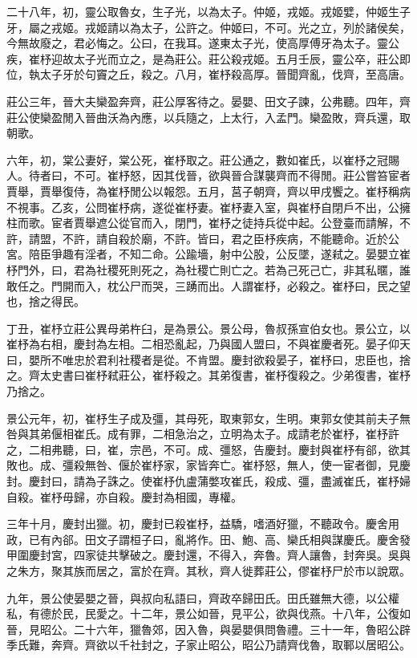 二十八年，初，靈公取魯女，生子光，以為太子。仲姬，戎姬。戎姬嬖，仲姬生子牙，屬之戎姬。戎姬請以為太子，公許之。仲姬曰，不可。光之立，列於諸侯矣，今無故廢之，君必悔之。公曰，在我耳。遂東太子光，使高厚傅牙為太子。靈公疾，崔杼迎故太子光而立之，是為莊公。莊公殺戎姬。五月壬辰，靈公卒，莊公即位，執太子牙於句竇之丘，殺之。八月，崔杼殺高厚。晉聞齊亂，伐齊，至高唐。

莊公三年，晉大夫欒盈奔齊，莊公厚客待之。晏嬰、田文子諫，公弗聽。四年，齊莊公使欒盈閒入晉曲沃為內應，以兵隨之，上太行，入孟門。欒盈敗，齊兵還，取朝歌。

六年，初，棠公妻好，棠公死，崔杼取之。莊公通之，數如崔氏，以崔杼之冠賜人。待者曰，不可。崔杼怒，因其伐晉，欲與晉合謀襲齊而不得閒。莊公嘗笞宦者賈舉，賈舉復侍，為崔杼閒公以報怨。五月，莒子朝齊，齊以甲戌饗之。崔杼稱病不視事。乙亥，公問崔杼病，遂從崔杼妻。崔杼妻入室，與崔杼自閉戶不出，公擁柱而歌。宦者賈舉遮公從官而入，閉門，崔杼之徒持兵從中起。公登臺而請解，不許，請盟，不許，請自殺於廟，不許。皆曰，君之臣杼疾病，不能聽命。近於公宮。陪臣爭趣有淫者，不知二命。公踰墻，射中公股，公反墜，遂弒之。晏嬰立崔杼門外，曰，君為社稷死則死之，為社稷亡則亡之。若為己死己亡，非其私暱，誰敢任之。門開而入，枕公尸而哭，三踴而出。人謂崔杼，必殺之。崔杼曰，民之望也，捨之得民。

丁丑，崔杼立莊公異母弟杵臼，是為景公。景公母，魯叔孫宣伯女也。景公立，以崔杼為右相，慶封為左相。二相恐亂起，乃與國人盟曰，不與崔慶者死。晏子仰天曰，嬰所不唯忠於君利社稷者是從。不肯盟。慶封欲殺晏子，崔杼曰，忠臣也，捨之。齊太史書曰崔杼弒莊公，崔杼殺之。其弟復書，崔杼復殺之。少弟復書，崔杼乃捨之。

景公元年，初，崔杼生子成及彊，其母死，取東郭女，生明。東郭女使其前夫子無咎與其弟偃相崔氏。成有罪，二相急治之，立明為太子。成請老於崔杼，崔杼許之，二相弗聽，曰，崔，宗邑，不可。成、彊怒，告慶封。慶封與崔杼有郤，欲其敗也。成、彊殺無咎、偃於崔杼家，家皆奔亡。崔杼怒，無人，使一宦者御，見慶封。慶封曰，請為子誅之。使崔杼仇盧蒲嫳攻崔氏，殺成、彊，盡滅崔氏，崔杼婦自殺。崔杼毋歸，亦自殺。慶封為相國，專權。

三年十月，慶封出獵。初，慶封已殺崔杼，益驕，嗜酒好獵，不聽政令。慶舍用政，已有內郤。田文子謂桓子曰，亂將作。田、鮑、高、欒氏相與謀慶氏。慶舍發甲圍慶封宮，四家徒共擊破之。慶封還，不得入，奔魯。齊人讓魯，封奔吳。吳與之朱方，聚其族而居之，富於在齊。其秋，齊人徙葬莊公，僇崔杼尸於市以說眾。

九年，景公使晏嬰之晉，與叔向私語曰，齊政卒歸田氏。田氏雖無大德，以公權私，有德於民，民愛之。十二年，景公如晉，見平公，欲與伐燕。十八年，公復如晉，見昭公。二十六年，獵魯郊，因入魯，與晏嬰俱問魯禮。三十一年，魯昭公辟季氏難，奔齊。齊欲以千社封之，子家止昭公，昭公乃請齊伐魯，取鄆以居昭公。

